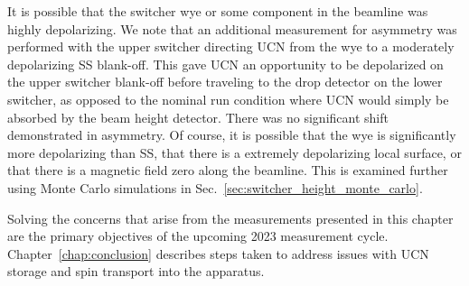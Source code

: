 It is possible that the switcher wye or some component in the beamline was highly depolarizing. We note that an additional measurement for asymmetry was performed with the upper switcher directing UCN from the wye to a moderately depolarizing SS blank-off. This gave UCN an opportunity to be depolarized on the upper switcher blank-off before traveling to the drop detector on the lower switcher, as opposed to the nominal run condition where UCN would simply be absorbed by the beam height detector. There was no significant shift demonstrated in asymmetry. Of course, it is possible that the wye is significantly more depolarizing than SS, that there is a extremely depolarizing local surface, or that there is a magnetic field zero along the beamline. This is examined further using Monte Carlo simulations in Sec.~\ref{sec:switcher_height_monte_carlo}.

Solving the concerns that arise from the measurements presented in this chapter are the primary objectives of the upcoming 2023 measurement cycle. Chapter~\ref{chap:conclusion} describes steps taken to address issues with UCN storage and spin transport into the apparatus.